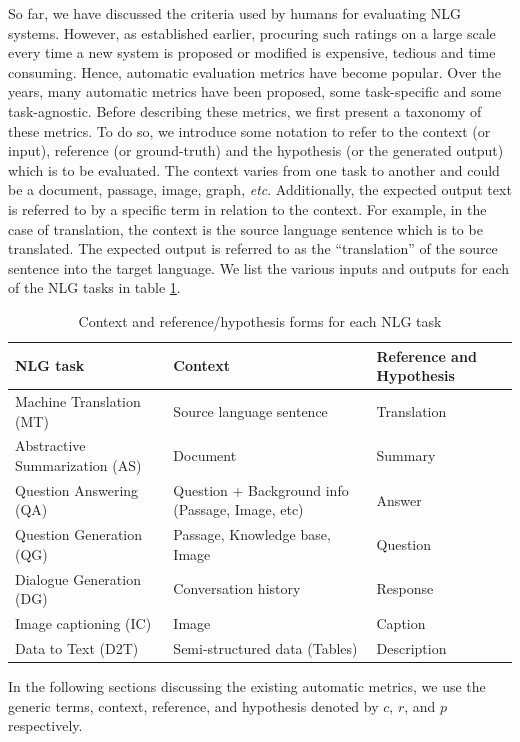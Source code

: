 \label{sec:taxonomy}
So far, we have discussed the criteria used by humans for evaluating NLG systems. However, as established earlier, procuring such ratings on a large scale every time a new system is proposed or modified is expensive, tedious and time consuming. Hence, automatic evaluation metrics have become popular. Over the years, many automatic metrics have been proposed, some task-specific and some task-agnostic. Before describing these metrics, we first present a taxonomy of these metrics. To do so, we introduce some notation to refer to the context (or input), reference (or ground-truth) and the hypothesis (or the generated output) which is to be evaluated. 
The context varies from one task to another and could be a document, passage, image, graph, \textit{etc}. Additionally, the expected output text is referred to by a specific term in relation to the context. For example, in the case of translation, the context is the source language sentence which is to be translated. The expected output is referred to as the ``translation'' of the source sentence into the target language. We list the various inputs and outputs for each of the NLG tasks in table \ref{tab:cont_and_ref_forms}. 
\begin{table}[h]
\centering
    \begin{tabular}{l|l|l}
         NLG task & Context & Reference and Hypothesis \\
         \hline
         Machine Translation (MT) & Source language sentence & Translation\\
         Abstractive Summarization (AS) & Document & Summary\\
         Question Answering (QA) & Question + Background info (Passage, Image, etc) & Answer\\
         Question Generation (QG) & Passage, Knowledge base, Image & Question\\
         Dialogue Generation (DG) & Conversation history & Response\\
         Image captioning (IC) & Image & Caption\\
         Data to Text (D2T) & Semi-structured data (Tables) & Description\\
         \hline
    \end{tabular}
    \caption{Context and reference/hypothesis forms for each NLG task}
    \label{tab:cont_and_ref_forms}
\end{table}
In the following sections discussing the existing automatic metrics, we use the generic terms, context, reference, and hypothesis denoted by $c$, $r$, and $p$ respectively. 
